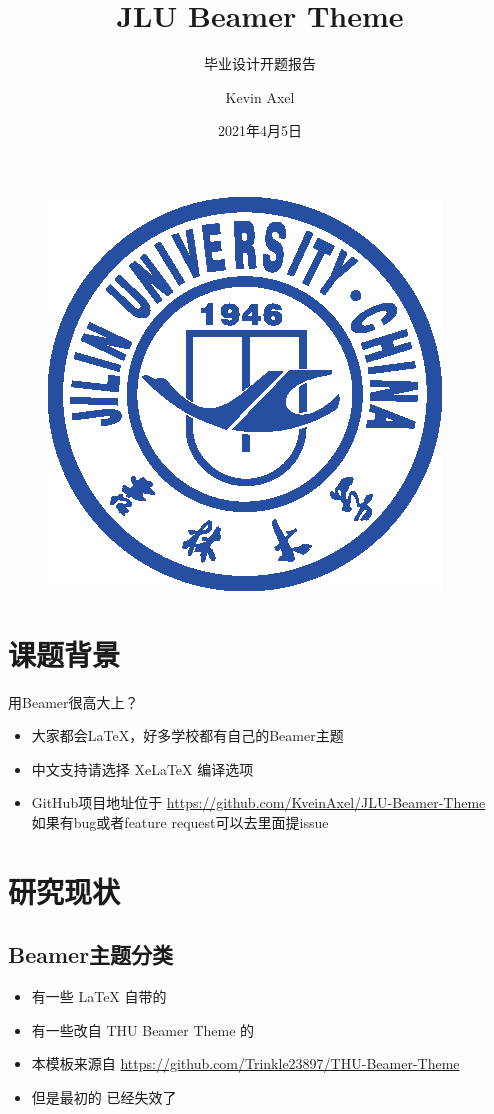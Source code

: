 \documentclass{beamer}
\author{Kevin Axel}
\title{JLU Beamer Theme}
\subtitle{毕业设计开题报告}
\institute{吉林大学软件学院}
\date{2021年4月5日}
\begin{document}
	
	\kaishu
	\begin{frame}
		\titlepage
		\begin{figure}[htpb]
			\begin{center}
				\includegraphics[width=0.2\linewidth]{pic/jlu_logo.eps}
			\end{center}
		\end{figure}
	\end{frame}
	
	\begin{frame}
		\tableofcontents[sectionstyle=show,subsectionstyle=show/shaded/hide,subsubsectionstyle=show/shaded/hide]
	\end{frame}
	
	
	\section{课题背景}
	
	\begin{frame}{用Beamer很高大上？}
		\begin{itemize}[<+-| alert@+>] %
			\item 大家都会\LaTeX{}，好多学校都有自己的Beamer主题
			\item 中文支持请选择 Xe\LaTeX{} 编译选项
			\item GitHub项目地址位于 \url{https://github.com/KveinAxel/JLU-Beamer-Theme} \\ 如果有bug或者feature request可以去里面提issue
		\end{itemize}
	\end{frame}
	
	
	\section{研究现状}
	
	\subsection{Beamer主题分类}
	
	\begin{frame}
		\begin{itemize}
			\item 有一些 \LaTeX{} 自带的
			\item 有一些改自 THU Beamer Theme 的
			\item 本模板来源自 \newline \url{https://github.com/Trinkle23897/THU-Beamer-Theme}
			\item 但是最初的 \href{http://far.tooold.cn/post/latex/beamertsinghua}{\color{purple}{link}} \cite{origin}已经失效了
		\end{itemize}
	\end{frame}
	
\end{document}
